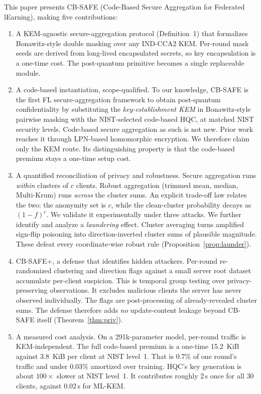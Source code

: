 \documentclass[lettersize,journal]{IEEEtran}
\begin{document}
This paper presents CB-SAFE (Code-Based Secure Aggregation for Federated
lEarning), making five contributions:
\begin{enumerate}
\item A KEM-agnostic secure-aggregation protocol (Definition~1) that
formalizes Bonawitz-style double masking over any IND-CCA2 KEM. Per-round mask seeds
are derived from long-lived encapsulated secrets, so key encapsulation is a one-time
cost. The post-quantum primitive becomes a single replaceable module.
\item A code-based instantiation, scope-qualified. To our knowledge, CB-SAFE
is the first FL secure-aggregation framework to obtain post-quantum confidentiality
by substituting the \emph{key-establishment KEM} in Bonawitz-style pairwise masking
with the NIST-selected code-based HQC, at matched NIST security levels. Code-based
secure aggregation as such is not new. Prior work \cite{lpnsecagg2026} reaches it
through LPN-based homomorphic encryption. We therefore claim only the KEM route. Its
distinguishing property is that the code-based premium stays a one-time setup cost.
\item A quantified reconciliation of privacy and robustness. Secure
aggregation runs \emph{within} clusters of $c$ clients. Robust aggregation (trimmed
mean, median, Multi-Krum) runs \emph{across} the cluster sums. An explicit trade-off
law relates the two: the anonymity set is $c$, while the clean-cluster probability
decays as $(1-f)^c$. We validate it experimentally under three attacks. We further
identify and analyze a \emph{laundering} effect. Cluster averaging turns amplified
sign-flip poisoning into direction-inverted cluster sums of plausible magnitude.
These defeat every coordinate-wise robust rule (Proposition~\ref{prop:launder}).
\item CB-SAFE+, a defense that identifies hidden attackers. Per-round
re-randomized clustering and direction flags against a small server root dataset
accumulate per-client suspicion. This is temporal group testing over
privacy-preserving observations. It excludes malicious clients the server has never
observed individually. The flags are post-processing of already-revealed cluster
sums. The defense therefore adds \emph{no} update-content leakage beyond CB-SAFE
itself (Theorem~\ref{thm:priv}).
\item A measured cost analysis. On a 291k-parameter model, per-round traffic
is KEM-independent. The full code-based premium is a one-time 15.2~KiB against
3.8~KiB per client at NIST level~1. That is $0.7\%$ of one round's traffic and under
$0.03\%$ amortized over training. HQC's key generation is about $100\times$ slower at
NIST level~1. It contributes roughly 2\,s once for all 30 clients, against 0.02\,s
for ML-KEM.
\end{enumerate}
\end{document}
